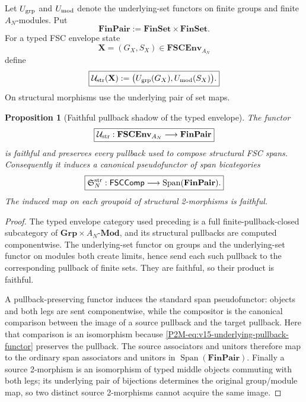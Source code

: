 \documentclass[11pt]{article}
\newtheorem{proposition}[theorem]{Proposition}
\theoremstyle{remark}
\providecommand{\FSCComp}{\mathsf{FSCComp}}
\begin{document}
Let $U_{\rm grp}$ and $U_{\rm mod}$ denote the underlying-set functors on
finite groups and finite $A_N$-modules.  Put
\[
 \mathbf{FinPair}:=\mathbf{FinSet}\times\mathbf{FinSet}.
\]
For a typed FSC envelope state
\[
 \mathbf X=(G_X,S_X)\in\mathbf{FSCEnv}_{A_N}
\]
define
\begin{equation}
 \boxed{
 \mathcal U_{\rm str}(\mathbf X)
 :=\bigl(U_{\rm grp}(G_X),U_{\rm mod}(S_X)\bigr).}
\end{equation}
On structural morphisms use the underlying pair of set maps.

\begin{proposition}[Faithful pullback shadow of the typed envelope]
\label{P2M-prop:v15-underlying-pullback-shadow}
The functor
\begin{equation}\label{P2M-eq:v15-underlying-pullback-functor}
 \boxed{
 \mathcal U_{\rm str}:
 \mathbf{FSCEnv}_{A_N}\longrightarrow\mathbf{FinPair}}
\end{equation}
is faithful and preserves every pullback used to compose structural FSC
spans.  Consequently it induces a canonical pseudofunctor of span
bicategories
\begin{equation}\label{P2M-eq:v15-span-shadow-pseudofunctor}
 \boxed{
 \mathfrak S_N^{\rm str}:
 \FSCComp\longrightarrow\operatorname{Span}(\mathbf{FinPair}).}
\end{equation}
The induced map on each groupoid of structural 2-morphisms is faithful.
\end{proposition}

\begin{proof}
The typed envelope category used preceding is a full finite-pullback-closed
subcategory of
$\mathbf{Grp}\times A_N\text{-}\mathbf{Mod}$, and its structural pullbacks
are computed componentwise.  The underlying-set functor on groups and the
underlying-set functor on modules both create limits, hence send each such
pullback to the corresponding pullback of finite sets.  They are faithful,
so their product is faithful.

A pullback-preserving functor induces the standard span pseudofunctor:
objects and both legs are sent componentwise, while the compositor is the
canonical comparison between the image of a source pullback and the target
pullback.  Here that comparison is an isomorphism because
\eqref{P2M-eq:v15-underlying-pullback-functor} preserves the pullback.  The source
associators and unitors therefore map to the ordinary span associators and
unitors in $\operatorname{Span}(\mathbf{FinPair})$.  Finally a source
2-morphism is an isomorphism of typed middle objects commuting with both legs;
its underlying pair of bijections determines the original group/module map,
so two distinct source 2-morphisms cannot acquire the same image.
\end{proof}
\end{document}
